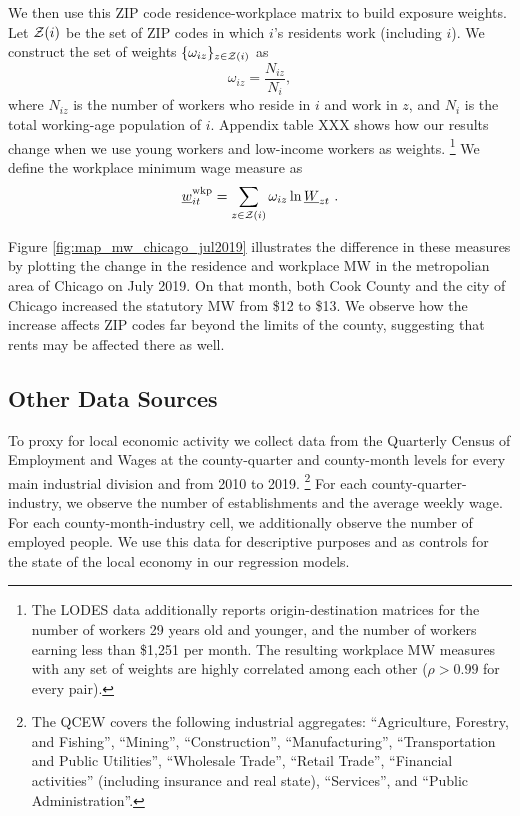 We then use this ZIP code residence-workplace matrix to build exposure weights.
Let $\mathcal{Z}(i)$ be the set of ZIP codes in which $i$'s residents work 
(including $i$).
We construct the set of weights $\{\omega_{iz}\}_{z\in\mathcal{Z}(i)}$ as 
$$
\omega_{iz} = \frac{N_{iz}}{N_i} ,
$$
where 
$N_{iz}$ is the number of workers who reside in $i$ and work in $z$, 
and $N_i$ is the total working-age population of $i$.
Appendix table XXX shows how our results change when we use young workers
and low-income workers as weights.%
\footnote{The LODES data additionally reports origin-destination matrices for 
the number of workers 29 years old and younger, and the number of workers 
earning less than \$1,251 per month.
The resulting workplace MW measures with any set of weights are highly correlated 
among each other ($\rho>0.99$ for every pair).}
We define the workplace minimum wage measure as
\begin{equation}
    \underline{w}^{\text{wkp}}_{it} = \sum_{z\in\mathcal{Z}(i)} \omega_{iz} \ln \underline{W}_{zt} \ .
\end{equation}

Figure \ref{fig:map_mw_chicago_jul2019} illustrates the difference in these 
measures by plotting the change in the residence and workplace MW 
in the metropolian area of Chicago on July 2019.
On that month, both Cook County and the city of Chicago increased the statutory 
MW from \$12 to \$13.
We observe how the increase affects ZIP codes far beyond the limits of the 
county, suggesting that rents may be affected there as well.

\subsection{Other Data Sources}\label{sec:data/other_data}

To proxy for local economic activity we collect data from the 
Quarterly Census of Employment and Wages \parencite[QCEW;][]{QCEW} 
at the county-quarter and county-month levels 
for every main industrial division and from 2010 to 2019.%
\footnote{The QCEW covers the following industrial aggregates: 
``Agriculture, Forestry, and Fishing'', ``Mining'', ``Construction'', ``Manufacturing'', 
``Transportation and Public Utilities'', ``Wholesale Trade'', ``Retail Trade'',
``Financial activities'' (including insurance and real state), ``Services'', and 
``Public Administration''.}
For each county-quarter-industry, we observe the number of establishments and the 
average weekly wage. For each county-month-industry cell, we additionally observe the number 
of employed people. We use this data for descriptive purposes and as controls for the 
state of the local economy in our regression models.

